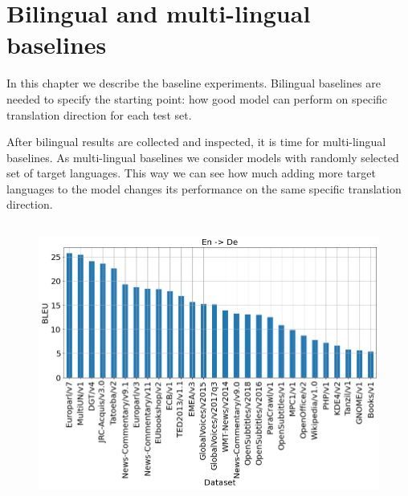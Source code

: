 \chapter{Bilingual and multi-lingual baselines}

In this chapter we describe the baseline experiments.
Bilingual baselines are needed to specify the starting point:
how good model can perform on specific translation direction
for each test set.

After bilingual results are collected and inspected, it is time for
multi-lingual baselines. As multi-lingual baselines we consider models
with randomly selected set of target languages. This way we can see
how much adding more target languages to the model changes its performance
on the same specific translation direction.


\section{}
\label{section:bilingual_baseline}


\begin{figure}[h]
	\centering
	\includegraphics[width=0.9\columnwidth]{../img/bilingual_en_de.png}
	\label{fig:bilingual_en_de}
\end{figure}


\section{}
\label{section:multilingual_baseline}

